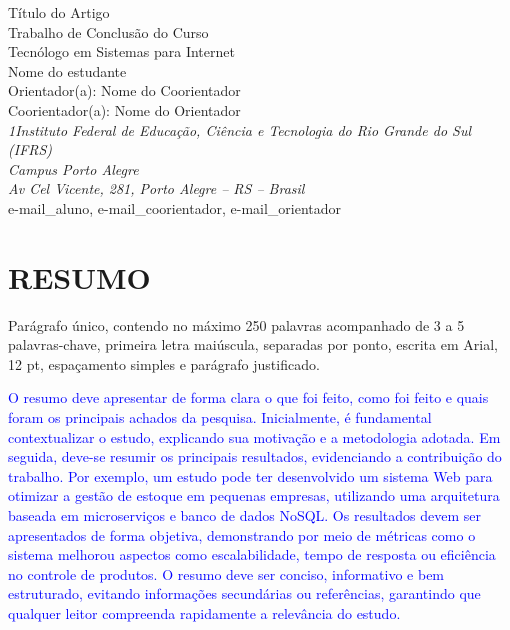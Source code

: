 \documentclass[a4paper,12pt]{article}
\begin{document}
\fontsize{12pt}{14pt}\selectfont %

\pagestyle{fancy} %
\fancyhf{} %
\fancyfoot[R]{\thepage} %
\renewcommand{\headrulewidth}{0pt} %
\renewcommand{\footrulewidth}{0pt} %

\begin{center}
    {\LARGE Título do Artigo}\\[0.8cm]
    {\large Trabalho de Conclusão do Curso}\\
    {\large Tecnólogo em Sistemas para Internet}\\[1cm]
    {\large Nome do estudante}\\
    Orientador(a): Nome do Coorientador\\
    Coorientador(a): Nome do Orientador\\[0.8cm]
    \textit{1Instituto Federal de Educação, Ciência e Tecnologia do Rio
    Grande do Sul (IFRS)\\
    Campus Porto Alegre\\
    Av Cel Vicente, 281, Porto Alegre – RS – Brasil}\\
    e-mail\_aluno, e-mail\_coorientador, e-mail\_orientador
\end{center}

\section*{RESUMO}
Parágrafo único, contendo no máximo 250 palavras acompanhado de 3 a 5
palavras-chave, primeira letra maiúscula, separadas por ponto, escrita em
Arial, 12 pt, espaçamento simples e parágrafo justificado.

\textcolor{blue}{
O resumo deve apresentar de forma clara o que foi feito, como foi feito e quais
foram os principais achados da pesquisa. Inicialmente, é fundamental
contextualizar o estudo, explicando sua motivação e a metodologia adotada. Em
seguida, deve-se resumir os principais resultados, evidenciando a contribuição
do trabalho. Por exemplo, um estudo pode ter desenvolvido um sistema Web para
otimizar a gestão de estoque em pequenas empresas, utilizando uma arquitetura
baseada em microserviços e banco de dados NoSQL. Os resultados devem ser
apresentados de forma objetiva, demonstrando por meio de métricas como o sistema
melhorou aspectos como escalabilidade, tempo de resposta ou eficiência no
controle de produtos. O resumo deve ser conciso, informativo e bem estruturado,
evitando informações secundárias ou referências, garantindo que qualquer leitor
compreenda rapidamente a relevância do estudo.
}
\end{document}
